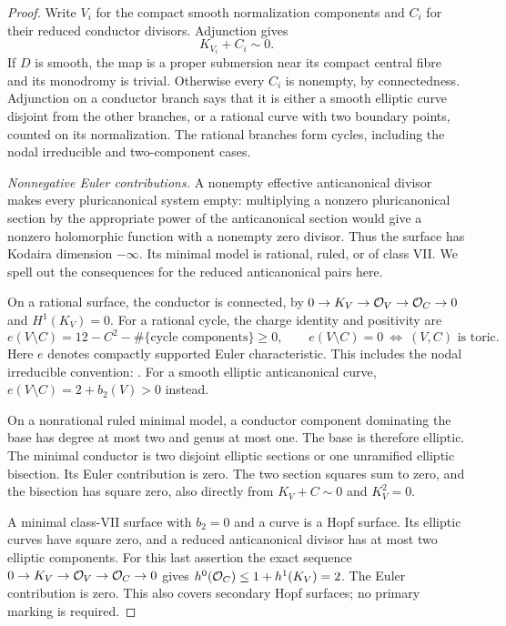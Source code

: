 \begin{proof}
Write $V_i$ for the compact smooth normalization
components and $C_i$ for their reduced conductor divisors.
Adjunction gives
\[
 K_{V_i}+C_i\sim0.                                  \tag{B.4.28.2}
\]
If $D$ is smooth, the map is a proper submersion near
its compact central fibre and its monodromy is trivial.
Otherwise every $C_i$ is nonempty, by connectedness.
Adjunction on a conductor branch says that it is either
a smooth elliptic curve disjoint from the other branches,
or a rational curve with two boundary points, counted
on its normalization. The rational branches form cycles,
including the nodal irreducible and two-component cases.

\emph{Nonnegative Euler contributions.}
A nonempty effective anticanonical divisor makes every
pluricanonical system empty: multiplying a nonzero
pluricanonical section by the appropriate power of the
anticanonical section would give a nonzero holomorphic
function with a nonempty zero divisor. Thus the surface
has Kodaira dimension $-\infty$. Its minimal model is
rational, ruled, or of class VII. We spell out the
consequences for the reduced anticanonical pairs here.

On a rational surface, the conductor is connected, by
$0\to K_V\to\mathcal O_V\to\mathcal O_C\to0$ and $H^1(K_V)=0$.
For a rational cycle, the charge identity and positivity
are
\[
 e(V\setminus C)=12-C^2-\#\{\text{cycle components}\}
 \ge0,\qquad
 e(V\setminus C)=0\ \Longleftrightarrow\ (V,C)
 \text{ is toric}.                                  \tag{B.4.28.3}
\]
Here $e$ denotes compactly supported Euler characteristic.
This includes the nodal irreducible convention:
\citet[Definition 1.1 and Lemmas 1.2, 2.2, 2.7]{Friedman2016AB}.
For a smooth elliptic anticanonical curve,
$e(V\setminus C)=2+b_2(V)>0$ instead.

On a nonrational ruled minimal model, a conductor
component dominating the base has degree at most two
and genus at most one. The base is therefore elliptic.
The minimal conductor is two disjoint elliptic sections
or one unramified elliptic bisection. Its Euler
contribution is zero. The two section squares sum to
zero, and the bisection has square zero, also directly
from $K_V+C\sim0$ and $K_V^2=0$.

A minimal class-VII surface with $b_2=0$ and a curve is
a Hopf surface. Its elliptic curves have square zero,
and a reduced anticanonical divisor has at most two
elliptic components. For this last assertion the exact
sequence $0\to K_V\to\mathcal O_V\to\mathcal O_C\to0$ gives
$h^0(\mathcal O_C)\le1+h^1(K_V)=2$.
The Euler contribution is zero. This also covers
secondary Hopf surfaces; no primary marking is required.


\end{proof}
